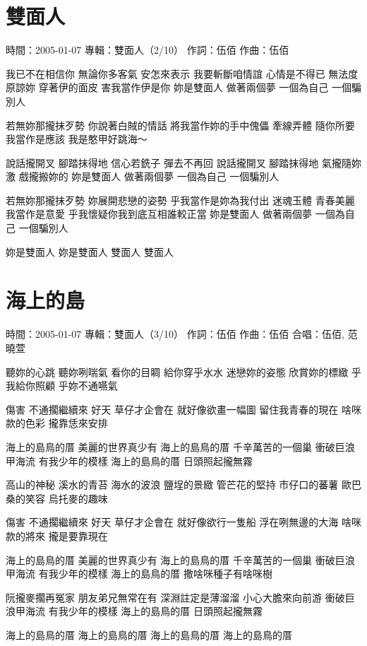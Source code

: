\documentclass[UTF8,a4paper,oneside,twocolumn,12pt]{ctexbook}
\newcommand{\infopair}[2]{\textbullet #1：#2}
\newcommand{\zc}[1][伍佰]{\infopair{作詞}{#1}}
\newcommand{\zq}[1][伍佰]{\infopair{作曲}{#1}}
\newcommand{\zj}[1]{\infopair{專輯}{#1}}
\newcommand{\sj}[1]{\infopair{時間}{#1}}
\newenvironment{info}{\begin{flushleft}\kaishu
	}
	{\end{flushleft}\normalsize\yahei\par}
\newenvironment{lyric}{
	}
{}
\begin{document}
\section{雙面人}
\begin{info}
	\sj{2005-01-07}
	\zj{雙面人（2/10）}
	\zc
	\zq
\end{info}
\begin{lyric}
	我已不在相信你 無論你多客氣
	安怎來表示 我要斬斷咱情誼
	心情是不得已 無法度原諒妳
	穿著伊的面皮 害我當作伊是你
	妳是雙面人 做著兩個夢
	一個為自己 一個騙別人

	若無妳那攏抹歹勢 你說著白賊的情話
	將我當作妳的手中傀儡
	牽線弄體 隨你所要 我當作是應該
	我是憨甲好跳海～

	說話攏開叉 腳踏抹得地
	信心若銑子 彈去不再回
	說話攏開叉 腳踏抹得地
	氣攏隨妳激 戲攏搬妳的
	妳是雙面人 做著兩個夢
	一個為自己 一個騙別人

	若無妳那攏抹歹勢 妳展開悲戀的姿勢
	乎我當作是妳為我付出
	迷魂玉體 青春美麗 我當作是意愛
	乎我懷疑你我到底互相誰較正當
	妳是雙面人 做著兩個夢
	一個為自己 一個騙別人

	妳是雙面人 妳是雙面人 雙面人 雙面人
\end{lyric}

\section{海上的島}
\begin{info}
	\sj{2005-01-07}
	\zj{雙面人（3/10）}
	\zc
	\zq
	\infopair{合唱}{伍佰, 范曉萱}
\end{info}
\begin{lyric}
	聽妳的心跳 聽妳咧喘氣
	看你的目睭 給你穿乎水水
	迷戀妳的姿態 欣賞妳的標緻
	乎我給你照顧 乎妳不通嚥氣

	傷害 不通擱繼續來
	好天 草仔才企會在
	就好像欲畫一幅圖 留住我青春的現在
	啥咪款的色彩 攏靠恁來安排

	海上的島鳥的厝 美麗的世界真少有
	海上的島鳥的厝 千辛萬苦的一個巢
	衝破巨浪甲海流 有我少年的模樣
	海上的島鳥的厝 日頭照起攏無霧

	高山的神秘 溪水的青苔
	海水的波浪 鹽埕的景緻
	管芒花的堅持 市仔口的蕃薯
	歐巴桑的笑容 烏托麥的趣味

	傷害 不通擱繼續來
	好天 草仔才企會在
	就好像欲行一隻船 浮在咧無邊的大海
	啥咪款的將來 攏是要靠現在

	海上的島鳥的厝 美麗的世界真少有
	海上的島鳥的厝 千辛萬苦的一個巢
	衝破巨浪甲海流 有我少年的模樣
	海上的島鳥的厝 撒啥咪種子有啥咪樹

	阮攏麥擱再冤家 朋友弟兄無常在有
	深淵註定是薄溜溜 小心大膽來向前游
	衝破巨浪甲海流 有我少年的模樣
	海上的島鳥的厝 日頭照起攏無霧

	海上的島鳥的厝 海上的島鳥的厝
	海上的島鳥的厝 海上的島鳥的厝
\end{lyric}
\end{document}

